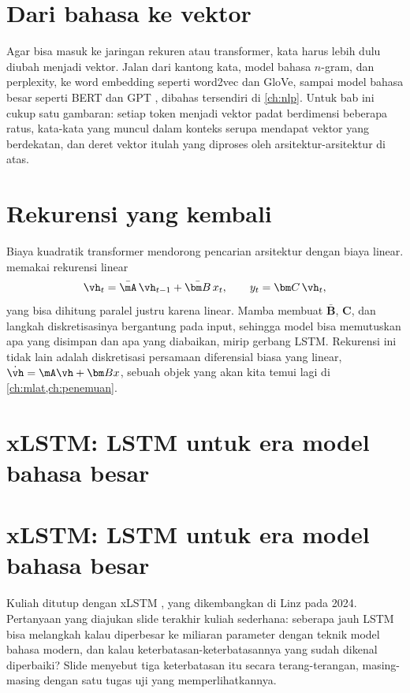 \section{Dari bahasa ke vektor}

Agar bisa masuk ke jaringan rekuren atau transformer, kata harus lebih dulu diubah menjadi vektor. Jalan dari kantong kata,
model bahasa $n$-gram, dan perplexity, ke word embedding seperti word2vec \citep{mikolov2013} dan GloVe, sampai model bahasa
besar seperti BERT \citep{devlin2019} dan GPT \citep{brown2020}, dibahas tersendiri di \cref{ch:nlp}. Untuk bab ini cukup satu
gambaran: setiap token menjadi vektor padat berdimensi beberapa ratus, kata-kata yang muncul dalam konteks serupa mendapat vektor
yang berdekatan, dan deret vektor itulah yang diproses oleh arsitektur-arsitektur di atas.

\section{Rekurensi yang kembali}

Biaya kuadratik transformer mendorong pencarian arsitektur dengan biaya linear.  memakai rekurensi linear
\begin{equation}
\vh_t=\bar{\mA}\,\vh_{t-1}+\bar{\bm B}\,x_t,\qquad y_t=\bm C\,\vh_t,
\end{equation}
yang bisa dihitung paralel justru karena linear. Mamba \citep{gu2023} membuat $\bar{\bm B}$,
$\bm C$, dan langkah diskretisasinya bergantung pada input, sehingga model bisa memutuskan apa
yang disimpan dan apa yang diabaikan, mirip gerbang LSTM. Rekurensi ini tidak lain adalah
diskretisasi persamaan diferensial biasa yang linear, $\dot{\vh}=\mA\vh+\bm Bx$, sebuah objek yang
akan kita temui lagi di \cref{ch:mlat,ch:penemuan}.

\section{xLSTM: LSTM untuk era model bahasa besar}

\section{xLSTM: LSTM untuk era model bahasa besar}

Kuliah ditutup dengan xLSTM \citep{beck2024}, yang dikembangkan di Linz pada 2024. Pertanyaan yang diajukan slide
terakhir kuliah sederhana: seberapa jauh LSTM bisa melangkah kalau diperbesar ke miliaran parameter dengan teknik
model bahasa modern, dan kalau keterbatasan-keterbatasannya yang sudah dikenal diperbaiki? Slide menyebut tiga
keterbatasan itu secara terang-terangan, masing-masing dengan satu tugas uji yang memperlihatkannya.

